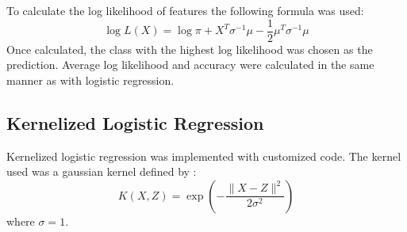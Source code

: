 \documentclass{report}
\begin{document}
To calculate the log likelihood of features the following formula was used:
\begin{equation}
    \log L(X) = \log \pi + X^T \sigma^{-1} \mu -\frac{1}{2} \mu^T \sigma^{-1}\mu
\end{equation}
Once calculated, the class with the highest log likelihood was chosen as the prediction. Average
log likelihood and accuracy were calculated in the same manner as with logistic regression.

\subsection*{Kernelized Logistic Regression}
Kernelized logistic regression was implemented with customized code. The kernel used
was a gaussian kernel defined by :
\begin{equation}
    K(X, Z) = \exp \left(-\frac{\| X - Z \|^2}{2\sigma^2}\right)
\end{equation}
where $\sigma = 1$. 
\end{document}
